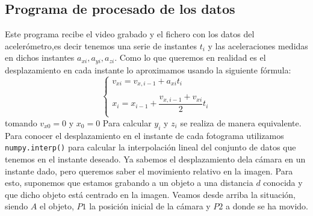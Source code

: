 \documentclass[a4paper,openright, 12pt]{book}
\begin{document}
\subsection{Programa de procesado de los datos}
Este programa recibe el video grabado y el fichero con los datos del acelerómetro,es decir tenemos una serie de instantes $t_i$ y las aceleraciones medidas en dichos instantes $a_{xi}, a_{yi}, a_{zi}$.
Como lo que queremos en realidad es el desplazamiento en cada instante lo aproximamos usando la siguiente fórmula:
\begin{equation}
\left\{ \begin{array}{lcc}
             v_{xi} = v_{x,i-1} + a_{xi}t_i \\
             \\ x_i = x_{i-1} + \dfrac{v_{x,i-1} + v_{xi}}{2} t_i \\
             \end{array}
   \right.
\end{equation}
tomando $v_{x0}=0$ y $x_0=0$
Para calcular $y_i$ y $z_i$ se realiza de manera equivalente.
\newline
Para conocer el desplazamiento en el instante de cada fotograma utilizamos \lstinline|numpy.interp()| para calcular la interpolación lineal del conjunto de datos que tenemos en el instante deseado. Ya sabemos el desplazamiento dela cámara en un instante dado, pero queremos saber el movimiento relativo en la imagen. Para esto, suponemos que estamos grabando a un objeto a una distancia $d$ conocida y que dicho objeto está centrado en la imagen.
Veamos desde arriba la situación, siendo $A$ el objeto, $P1$ la posición inicial de la cámara y $P2$ a donde se ha movido. 
\end{document}
